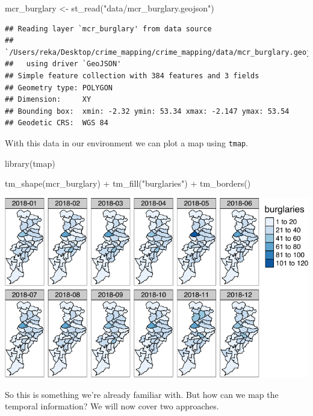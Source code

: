 \documentclass[
  krantz2]{krantz}
\makeatletter
\newenvironment{Shaded}{\begin{snugshade}}{\end{snugshade}}
\newcommand{\FunctionTok}[1]{\textcolor[rgb]{0,0,0}{#1}}
\newcommand{\NormalTok}[1]{#1}
\newcommand{\OtherTok}[1]{\textcolor[rgb]{0.37,0.37,0.37}{#1}}
\newcommand{\SpecialCharTok}[1]{\textcolor[rgb]{0,0,0}{#1}}
\newcommand{\StringTok}[1]{\textcolor[rgb]{0.5,0.5,0.5}{#1}}
\newenvironment{kframe}{%
\medskip{}
\setlength{\fboxsep}{.8em}
 \def\at@end@of@kframe{}%
 \ifinner\ifhmode%
  \def\at@end@of@kframe{\end{minipage}}%
  \begin{minipage}{\columnwidth}%
 \fi\fi%
 \def\FrameCommand##1{\hskip\@totalleftmargin \hskip-\fboxsep
 \colorbox{shadecolor}{##1}\hskip-\fboxsep
     \hskip-\linewidth \hskip-\@totalleftmargin \hskip\columnwidth}%
 \MakeFramed {\advance\hsize-\width
   \@totalleftmargin\z@ \linewidth\hsize
   \@setminipage}}%
 {\par\unskip\endMakeFramed%
 \at@end@of@kframe}
\renewenvironment{Shaded}{\begin{kframe}}{\end{kframe}}
\makeatother
\begin{document}
\begin{Shaded}
\begin{Highlighting}[]
\NormalTok{mcr\_burglary }\OtherTok{\textless{}{-}} \FunctionTok{st\_read}\NormalTok{(}\StringTok{"data/mcr\_burglary.geojson"}\NormalTok{)}
\end{Highlighting}
\end{Shaded}

\begin{verbatim}
## Reading layer `mcr_burglary' from data source 
##   `/Users/reka/Desktop/crime_mapping/crime_mapping/data/mcr_burglary.geojson' 
##   using driver `GeoJSON'
## Simple feature collection with 384 features and 3 fields
## Geometry type: POLYGON
## Dimension:     XY
## Bounding box:  xmin: -2.32 ymin: 53.34 xmax: -2.147 ymax: 53.54
## Geodetic CRS:  WGS 84
\end{verbatim}

With this data in our environment we can plot a map using \texttt{tmap}.

\begin{Shaded}
\begin{Highlighting}[]
\FunctionTok{library}\NormalTok{(tmap)}

\FunctionTok{tm\_shape}\NormalTok{(mcr\_burglary) }\SpecialCharTok{+} 
  \FunctionTok{tm\_fill}\NormalTok{(}\StringTok{"burglaries"}\NormalTok{) }\SpecialCharTok{+}
  \FunctionTok{tm\_borders}\NormalTok{() }
\end{Highlighting}
\end{Shaded}

\includegraphics{crime_mapping_files/figure-latex/unnamed-chunk-180-1.pdf}

So this is something we're already familiar with. But how can we map the temporal information? We will now cover two approaches.
\end{document}
